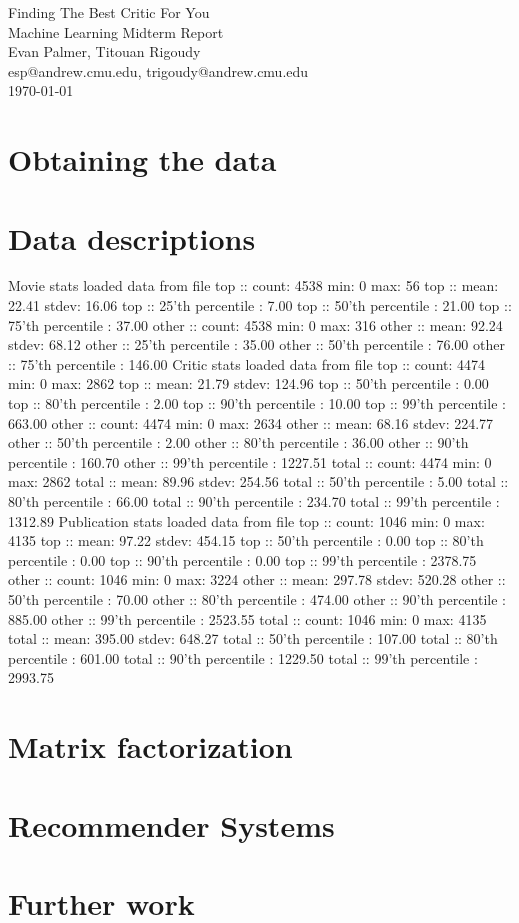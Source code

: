 \documentclass[12pt]{article}
\makeatletter
\newcommand{\myname}{Evan Palmer, Titouan Rigoudy}
\newcommand{\myandrew}{esp@andrew.cmu.edu, trigoudy@andrew.cmu.edu}
\newcommand{\thedate}{\today}
\makeatother
\begin{document}
	\medskip    
	\thispagestyle{plain}
	\begin{center}                 
	{\LARGE Finding The Best Critic For You} \\
	\medskip
	Machine Learning Midterm Report \\
	\smallskip
	\myname \\
	\myandrew \\
	\thedate \\
	\end{center}
	\vspace{0.5cm}


\section{Obtaining the data}

\section{Data descriptions}

Movie stats
loaded data from file
top :: count: 4538 min: 0 max: 56
top :: mean: 22.41 stdev: 16.06
top :: 25'th percentile : 7.00
top :: 50'th percentile : 21.00
top :: 75'th percentile : 37.00
other :: count: 4538 min: 0 max: 316
other :: mean: 92.24 stdev: 68.12
other :: 25'th percentile : 35.00
other :: 50'th percentile : 76.00
other :: 75'th percentile : 146.00
Critic stats
loaded data from file
top :: count: 4474 min: 0 max: 2862
top :: mean: 21.79 stdev: 124.96
top :: 50'th percentile : 0.00
top :: 80'th percentile : 2.00
top :: 90'th percentile : 10.00
top :: 99'th percentile : 663.00
other :: count: 4474 min: 0 max: 2634
other :: mean: 68.16 stdev: 224.77
other :: 50'th percentile : 2.00
other :: 80'th percentile : 36.00
other :: 90'th percentile : 160.70
other :: 99'th percentile : 1227.51
total :: count: 4474 min: 0 max: 2862
total :: mean: 89.96 stdev: 254.56
total :: 50'th percentile : 5.00
total :: 80'th percentile : 66.00
total :: 90'th percentile : 234.70
total :: 99'th percentile : 1312.89
Publication stats
loaded data from file
top :: count: 1046 min: 0 max: 4135
top :: mean: 97.22 stdev: 454.15
top :: 50'th percentile : 0.00
top :: 80'th percentile : 0.00
top :: 90'th percentile : 0.00
top :: 99'th percentile : 2378.75
other :: count: 1046 min: 0 max: 3224
other :: mean: 297.78 stdev: 520.28
other :: 50'th percentile : 70.00
other :: 80'th percentile : 474.00
other :: 90'th percentile : 885.00
other :: 99'th percentile : 2523.55
total :: count: 1046 min: 0 max: 4135
total :: mean: 395.00 stdev: 648.27
total :: 50'th percentile : 107.00
total :: 80'th percentile : 601.00
total :: 90'th percentile : 1229.50
total :: 99'th percentile : 2993.75

\section{Matrix factorization}

\section{Recommender Systems}

\section{Further work}
\end{document}
